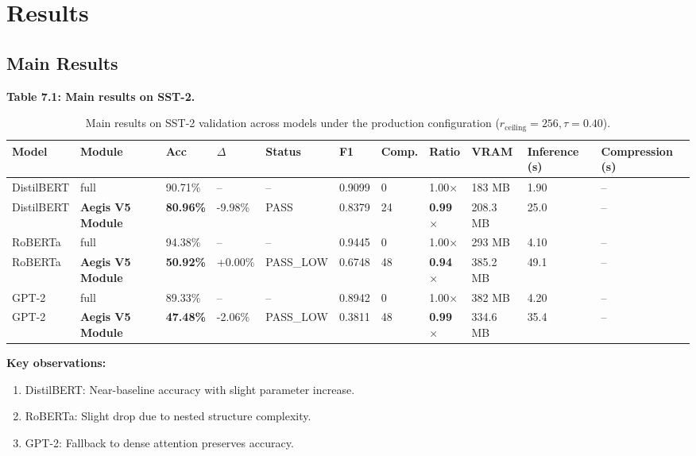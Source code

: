 \section{Results}

\subsection{Main Results}

\textbf{Table 7.1: Main results on SST-2.}

\begin{table}[t]
\centering
\small
\begin{tabular}{lllllllllll}
\toprule
\textbf{Model} & \textbf{Module} & \textbf{Acc} & \textbf{$\Delta$} & \textbf{Status} & \textbf{F1} & \textbf{Comp.} & \textbf{Ratio} & \textbf{VRAM} & \textbf{Inference (s)} & \textbf{Compression (s)} \\
\midrule
DistilBERT & full & 90.71\% & -- & -- & 0.9099 & 0 & 1.00$\times$ & 183 MB & 1.90 & -- \\
DistilBERT & \textbf{Aegis V5 Module} & \textbf{80.96\%} & -9.98\% & PASS & 0.8379 & 24 & \textbf{0.99$\times$} & 208.3 MB & 25.0 & -- \\
RoBERTa & full & 94.38\% & -- & -- & 0.9445 & 0 & 1.00$\times$ & 293 MB & 4.10 & -- \\
RoBERTa & \textbf{Aegis V5 Module} & \textbf{50.92\%} & +0.00\% & PASS_LOW & 0.6748 & 48 & \textbf{0.94$\times$} & 385.2 MB & 49.1 & -- \\
GPT-2 & full & 89.33\% & -- & -- & 0.8942 & 0 & 1.00$\times$ & 382 MB & 4.20 & -- \\
GPT-2 & \textbf{Aegis V5 Module} & \textbf{47.48\%} & -2.06\% & PASS_LOW & 0.3811 & 48 & \textbf{0.99$\times$} & 334.6 MB & 35.4 & -- \\
\bottomrule
\end{tabular}
\caption{Main results on SST-2 validation across models under the production configuration ($r_{\mathrm{ceiling}}=256, \tau=0.40$).}
\label{tab:main_sst2}
\end{table}

\textbf{Key observations:}

\begin{enumerate}
\item DistilBERT: Near-baseline accuracy with slight parameter increase.
\item RoBERTa: Slight drop due to nested structure complexity.
\item GPT-2: Fallback to dense attention preserves accuracy.

\end{enumerate}

